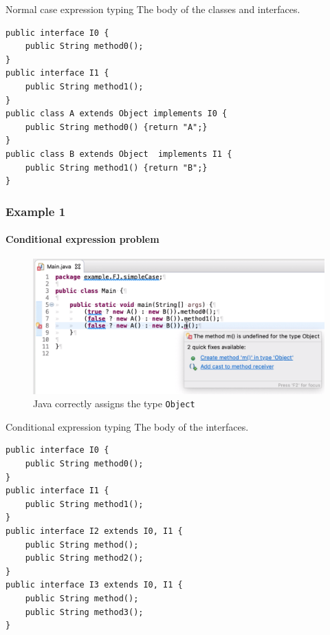 \documentclass{beamer}
\begin{document}
\begin{frame}[fragile]{Normal case expression typing}
\boldmath
The body of the classes and interfaces.	\begin{flushleft}
\begin{lstlisting}[basicstyle=\scriptsize]
public interface I0 {
	public String method0();
}
public interface I1 {
	public String method1();
}
public class A extends Object implements I0 {
	public String method0() {return "A";}
}
public class B extends Object  implements I1 {
	public String method1() {return "B";}
}
\end{lstlisting}
\end{flushleft}

\end{frame}

\begin{frame}
\frametitle{Example 1}
\framesubtitle{Conditional expression problem}
\begin{figure}
\centering
\includegraphics[width=1\linewidth]{images/example-normal-type.png}
\caption{Java correctly assigns the type \texttt{Object}}
\label{fig:mainres}
\end{figure}
\end{frame}


\begin{frame}[fragile]{Conditional expression typing}
\boldmath
The body of the interfaces.	\begin{flushleft}
\begin{lstlisting}[basicstyle=\scriptsize]
public interface I0 {
	public String method0();
}
public interface I1 {
	public String method1();
}
public interface I2 extends I0, I1 {
	public String method();
	public String method2();
}
public interface I3 extends I0, I1 {
	public String method();
	public String method3();
}
\end{lstlisting}
\end{flushleft}
\end{frame}
\end{document}
